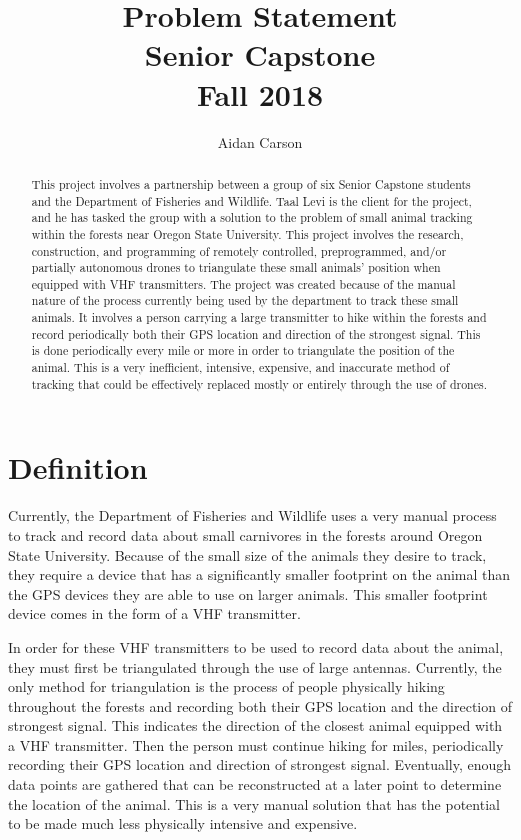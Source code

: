 \documentclass{article}
\title{Problem Statement\\[1em]
        \large Senior Capstone\\
        \large Fall 2018}
\author{Aidan Carson}
\begin{document}
\begin{titlingpage}
    \maketitle
    \begin{abstract}
        This project involves a partnership between a group of six Senior Capstone students and the Department of Fisheries and Wildlife. Taal Levi is the client for the project, and he has tasked the group with a solution to the problem of small animal tracking within the forests near Oregon State University. This project involves the research, construction, and programming of remotely controlled, preprogrammed, and/or partially autonomous drones to triangulate these small animals' position when equipped with VHF transmitters. The project was created because of the manual nature of the process currently being used by the department to track these small animals. It involves a person carrying a large transmitter to hike within the forests and record periodically both their GPS location and direction of the strongest signal. This is done periodically every mile or more in order to triangulate the position of the animal. This is a very inefficient, intensive, expensive, and inaccurate method of tracking that could be effectively replaced mostly or entirely through the use of drones.
    \end{abstract}
\end{titlingpage}

\section{Definition}
Currently, the Department of Fisheries and Wildlife uses a very manual process to track and record data about small carnivores in the forests around Oregon State University. Because of the small size of the animals they desire to track, they require a device that has a significantly smaller footprint on the animal than the GPS devices they are able to use on larger animals. This smaller footprint device comes in the form of a VHF transmitter.

In order for these VHF transmitters to be used to record data about the animal, they must first be triangulated through the use of large antennas. Currently, the only method for triangulation is the process of people physically hiking throughout the forests and recording both their GPS location and the direction of strongest signal. This indicates the direction of the closest animal equipped with a VHF transmitter. Then the person must continue hiking for miles, periodically recording their GPS location and direction of strongest signal. Eventually, enough data points are gathered that can be reconstructed at a later point to determine the location of the animal. This is a very manual solution that has the potential to be made much less physically intensive and expensive.
\end{document}
